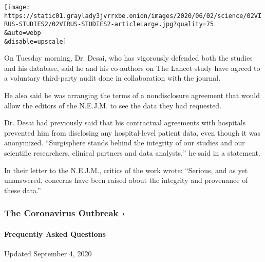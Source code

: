 \texttt{[image: https://static01.graylady3jvrrxbe.onion/images/2020/06/02/science/02VIRUS-STUDIES2/02VIRUS-STUDIES2-articleLarge.jpg?quality=75\\\&auto=webp\\\&disable=upscale]}

On Tuesday morning, Dr. Desai, who has vigorously defended both the
studies and his database, said he and his co-authors on The Lancet study
have agreed to a voluntary third-party audit done in collaboration with
the journal.

He also said he was arranging the terms of a nondisclosure agreement
that would allow the editors of the N.E.J.M. to see the data they had
requested.

Dr. Desai had previously said that his contractual agreements with
hospitals prevented him from disclosing any hospital-level patient data,
even though it was anonymized. ``Surgisphere stands behind the integrity
of our studies and our scientific researchers, clinical partners and
data analysts,'' he said in a statement.

In their letter to the N.E.J.M., critics of the work wrote: ``Serious,
and as yet unanswered, concerns have been raised about the integrity and
provenance of these data.''

\href{https://www.nytimes3xbfgragh.onion/news-event/coronavirus?action=click\&pgtype=Article\&state=default\&region=MAIN_CONTENT_3\&context=storylines_faq}{}

\hypertarget{the-coronavirus-outbreak-}{%
\subsubsection{The Coronavirus Outbreak
›}\label{the-coronavirus-outbreak-}}

\hypertarget{frequently-asked-questions}{%
\paragraph{Frequently Asked
Questions}\label{frequently-asked-questions}}

Updated September 4, 2020

